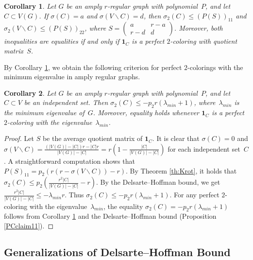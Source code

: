\documentclass[11pt]{article}
\newtheorem{corollary}{Corollary}[section]
\theoremstyle{definition}
\begin{document}
\begin{corollary}\label{krotov} Let $G$ be an amply $r$-regular graph with
polynomial~$P$, and  let $C\subset V(G)$. If $\sigma(C)= a$ and
$\sigma(V\backslash C)= d $, then $\sigma_2(C)\leq (P(S))_{11}$ and
$\sigma_2(V\backslash C)\leq (P(S))_{22} $, where $S=\begin{pmatrix}
a & r-a \\
r-d & d
\end{pmatrix}$.
Moreover,  both inequalities are equalities if and only if
${\mathbf{1}}_C$ is a perfect $2$-coloring with quotient matrix~$S$.
\end{corollary}

By Corollary  \ref{krotov}, we  obtain the following criterion
for perfect $2$-colorings with the minimum eigenvalue in amply
regular graphs.







\begin{corollary}\label{corExt}
Let $G$ be an amply $r$-regular graph with polynomial~$P$,  and let
$C\subset V$ be an independent set.   Then $\sigma_2(C)\leq
-p_2r(\lambda_{min}+1)$, where~$\lambda_{min}$ is
the minimum eigenvalue of~$G$. Moreover, equality holds whenever ${\mathbf{1}}_C$ is
a perfect $2$-coloring with the eigenvalue~$\lambda_{min}$.
\end{corollary}
\begin{proof}
Let  $S$ be the  average  quotient matrix of  ${\mathbf{1}}_C$.
 It is clear that  $\sigma(C)=0$ and $\sigma(V\backslash C)=\frac{(|V(G)|-|C|)r-|C|r}{|V(G)|-|C|}=
r(1-\frac{|C|}{|V(G)|-|C|})$ for each independent set~$C$. A straightforward computation shows 
 that $P(S)_{11}=p_2(r(r-\sigma(V\backslash C))-r)$. By Theorem \ref{th:Krot}, it
holds that $\sigma_2(C)\leq p_2(\frac{r^2|C|}{|V(G)|-|C|}-r)$. By the Delsarte--Hoffman
bound, we get $\frac{r^2|C|}{|V(G)|-|C|}\leq -\lambda_{min}r$.
Thus $\sigma_2(C)\leq -p_2r(\lambda_{min}+1)$.  For any perfect
$2$-coloring with the eigenvalue~$\lambda_{min}$, the
equality $\sigma_2(C)= -p_2r(\lambda_{min}+1)$ follows from Corollary \ref{krotov} and the Delsarte--Hoffman
bound
(Proposition \ref{PCclaim11}). \end{proof}


\subsection{Generalizations of Delsarte--Hoffman Bound}
\end{document}
